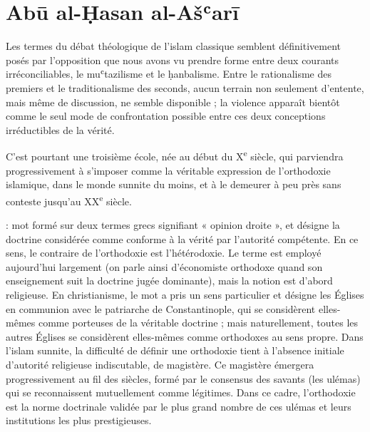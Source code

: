  

\hypertarget{suxe9ance-4}{%
\chapter{Abū al-Ḥasan al-Ašʿarī}\label{suxe9ance-4}}

Les termes du débat théologique de l'islam classique semblent
définitivement posés par l'opposition que nous avons vu prendre forme
entre deux courants irréconciliables, le muʿtazilisme et le ḥanbalisme.
Entre le rationalisme des premiers et le traditionalisme des seconds,
aucun terrain non seulement d'entente, mais même de discussion, ne
semble disponible ; la violence apparaît bientôt comme le seul mode de
confrontation possible entre ces deux conceptions irréductibles de la
vérité.

C'est pourtant une troisième école, née au début du X\textsuperscript{e}
siècle, qui parviendra progressivement à s'imposer comme la véritable
expression de l'orthodoxie islamique, dans le monde sunnite du moins,
et à le demeurer à peu près sans conteste jusqu'au XX\textsuperscript{e}
siècle. 
\begin{Def}[Orthodoxie]
: mot formé sur deux termes grecs signifiant « opinion droite », et désigne la doctrine considérée comme conforme à la vérité par l’autorité compétente. En ce sens, le contraire de l’orthodoxie est l’hétérodoxie. Le terme est employé aujourd’hui largement (on parle ainsi d’économiste orthodoxe quand son enseignement suit la doctrine jugée dominante), mais la notion est d’abord religieuse. En christianisme, le mot a pris un sens particulier et désigne les Églises en communion avec le patriarche de Constantinople, qui se considèrent elles-mêmes comme porteuses de la véritable doctrine ; mais naturellement, toutes les autres Églises se considèrent elles-mêmes comme orthodoxes au sens propre. Dans l’islam sunnite, la difficulté de définir une orthodoxie tient à l’absence initiale d’autorité religieuse indiscutable, de magistère. Ce magistère émergera progressivement au fil des siècles, formé par le consensus des savants (les ulémas) qui se reconnaissent mutuellement comme légitimes. Dans ce cadre, l’orthodoxie est la norme doctrinale validée par le plus grand nombre de ces ulémas et leurs institutions les plus prestigieuses.
\end{Def}


